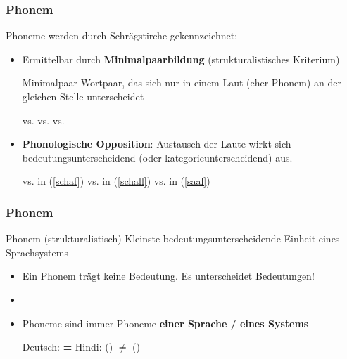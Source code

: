 
\begin{frame}
\frametitle{Phonem}

Phoneme werden durch Schrägstirche gekennzeichnet: \textipa{/ /}
	
	\begin{itemize}
		\item Ermittelbar durch \textbf{Minimalpaarbildung} (strukturalistisches Kriterium)
		
		\begin{block}{Minimalpaar}
Wortpaar, das sich nur in einem Laut (eher Phonem) an der gleichen Stelle unterscheidet
		\end{block}
	
	\eal
		\ex \label{schaf} \textipa{[Sa:l]}   vs. \textipa{[Sa:f]} 
		\ex\label{schall} \textipa{[Sa:l]}  vs. \textipa{[Sal]} 
		\ex \label{saal} \textipa{[Sa:l]}  vs. \textipa{[za:l]} 
	\zl
	
		\item \textbf{Phonologische Opposition}: Austausch der Laute wirkt sich bedeutungsunterscheidend (oder kategorieunterscheidend) aus.
	
	\eal
		\ex {} vs.  in (\ref{schaf})
		\ex {} vs.  in (\ref{schall})
		\ex {} vs.  in (\ref{saal})
	\zl			
	
	\end{itemize}
	


\end{frame}




\begin{frame}
\frametitle{Phonem}

\begin{block}{Phonem (strukturalistisch)}
Kleinste bedeutungsunterscheidende Einheit eines Sprachsystems
\end{block}

\begin{itemize}
	\item Ein Phonem trägt keine Bedeutung. Es unterscheidet Bedeutungen!
	\item[]
	\item Phoneme sind immer Phoneme \textbf{einer Sprache / eines Systems}

	\eal
		\ex Deutsch: \textipa{[papa]} \textbf{=} 
		\ex Hindi: \textipa{[pal]} () \textbf{$\neq$} \textipa{[p\super{h}al]} ()
	\zl

\end{itemize}

\end{frame}



